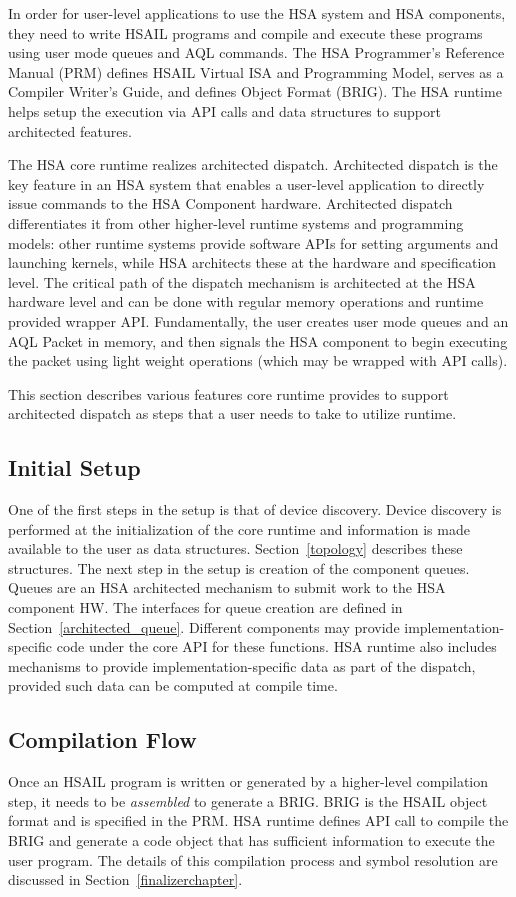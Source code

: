 \documentclass{book}
\begin{document}
In order for user-level applications to use the HSA system and HSA
components, they need to write HSAIL programs and compile and
execute these programs using user mode queues and AQL commands.  The
HSA Programmer’s Reference Manual (PRM) defines HSAIL Virtual ISA
and Programming Model, serves as a Compiler Writer’s Guide, and
defines Object Format (BRIG). The HSA runtime helps setup the
execution via API calls and data structures to support architected
features.

The HSA core runtime realizes architected dispatch. Architected
dispatch is the key feature in an HSA system that enables a
user-\/level application to directly issue commands to the HSA
Component hardware.  Architected dispatch differentiates it from
other higher-\/level runtime systems and programming models\-: other
runtime systems provide software A\-P\-Is for setting arguments and
launching kernels, while H\-S\-A architects these at the hardware
and specification level.  The critical path of the dispatch
mechanism is architected at the H\-S\-A hardware level and can be
done with regular memory operations and runtime provided wrapper
API.  Fundamentally, the user creates user mode queues and an
A\-Q\-L Packet in memory, and then signals the HSA component to
begin executing the packet using light weight operations (which may
be wrapped with A\-P\-I calls).

This section describes various features core runtime provides to
support architected dispatch as steps that a user needs to take to
utilize runtime.

\subsection{Initial Setup}
One of the first steps in the setup is that of device discovery.
Device discovery is performed at the initialization of the core
runtime and information is made available to the user as data
structures. Section~\ref{topology} describes these structures.
The next step in the setup is creation of the
component queues. Queues are an HSA architected mechanism to submit
work to the HSA component HW. The interfaces for queue creation
are defined in Section~\ref{architected_queue}. Different
components may provide
implementation-\/specific code under the core A\-P\-I for these
functions. H\-S\-A runtime also includes mechanisms to provide
implementation-\/specific data as part of the dispatch, provided
such data can be computed at compile time.

\subsection{Compilation Flow}
Once an HSAIL program is written or generated by a higher-level
compilation step, it needs to be \emph{assembled} to generate a
BRIG. BRIG is the HSAIL object format and is specified in the PRM.
HSA runtime defines API call to compile the BRIG and generate a code
object that has sufficient information to execute the user
program. The details of this compilation process and symbol
resolution are discussed in Section~\ref{finalizerchapter}.
\end{document}
